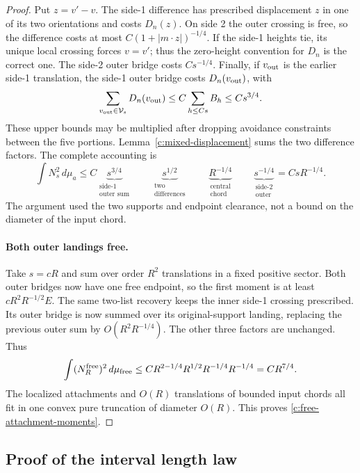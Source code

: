 \documentclass[11pt]{article}
\numberwithin{equation}{section}
\theoremstyle{definition}\newtheorem{definition}[theorem]{Definition}
\theoremstyle{remark}\newtheorem{remark}[theorem]{Remark}
\begin{document}
\begin{proof}
Put $z=v'-v$. The side-1 difference has prescribed displacement $z$
in one of its two orientations and costs $D_n(z)$. On side 2 the outer
crossing is free, so the difference costs at most
$C(1+|m\cdot z|)^{-1/4}$. If the side-1 heights tie, its unique local
crossing forces $v=v'$; thus the zero-height convention for $D_n$ is
the correct one. The side-2 outer bridge costs $Cs^{-1/4}$. Finally,
if $v_{\rm out}$ is the earlier side-1 translation, the side-1 outer
bridge costs $D_n(v_{\rm out})$, with
\[
 \sum_{v_{\rm out}\in\mathcal V_s}D_n(v_{\rm out})
 \le C\sum_{h\le Cs}B_h\le Cs^{3/4}.
\]
These upper bounds may be multiplied after dropping avoidance constraints
between the five portions. Lemma~\ref{c:mixed-displacement} sums the two
difference factors. The complete accounting is
\[
 \int N_s^2\,d\mu_a
 \le C\underbrace{s^{3/4}}_{\substack{\text{side-1}\\\text{outer sum}}}
       \qquad\underbrace{s^{1/2}}_{\substack{\text{two}\\\text{differences}}}
       \qquad\underbrace{R^{-1/4}}_{\substack{\text{central}\\\text{chord}}}
       \qquad\underbrace{s^{-1/4}}_{\substack{\text{side-2}\\\text{outer}}}
 =CsR^{-1/4}.
\]
The argument used the two supports and endpoint clearance, not a bound
on the diameter of the input chord.

\paragraph{Both outer landings free.}
Take $s=cR$ and sum over order $R^2$ translations in a fixed positive
sector. Both outer bridges now have one free endpoint, so the first
moment is at least $cR^2R^{-1/2}E$. The same two-list recovery keeps
the inner side-1 crossing prescribed. Its outer bridge is now summed
over its original-support landing, replacing the previous outer sum by
$O(R^2R^{-1/4})$. The other three factors are unchanged. Thus
\[
 \int(N_R^{\rm free})^2\,d\mu_{\rm free}
 \le CR^{2-1/4}R^{1/2}R^{-1/4}R^{-1/4}=CR^{7/4}.
\]
The localized attachments and $O(R)$ translations of bounded input
chords all fit in one convex pure truncation of diameter $O(R)$.
This proves \eqref{c:free-attachment-moments}.
\end{proof}

\subsection{Proof of the interval length law}
\end{document}

